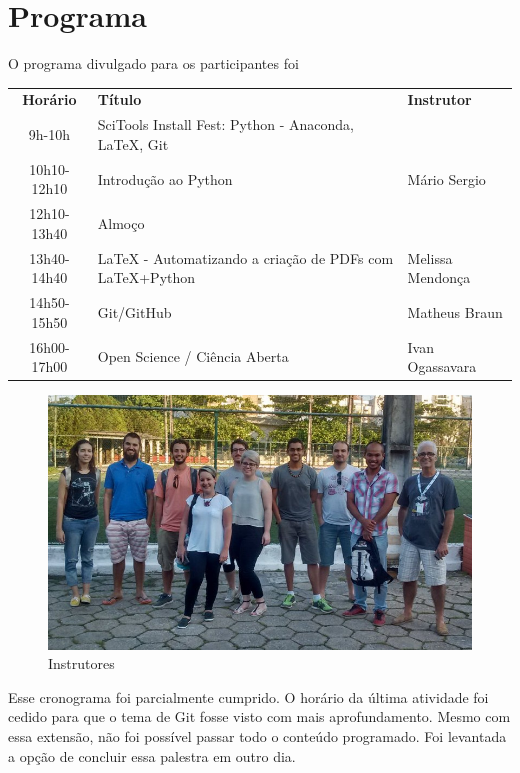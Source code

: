 \documentclass[12pt]{article}
\begin{document}
\newpage

\section*{Programa}

O programa divulgado para os participantes foi

\begin{tabular}{cp{}l}
  \textbf{Horário} & \textbf{Título} & \textbf{Instrutor} \\
  9h-10h & SciTools Install Fest: Python - Anaconda, LaTeX, Git & \\
  10h10-12h10 & Introdução ao Python & Mário Sergio \\
  12h10-13h40 & Almoço \\
  13h40-14h40 & LaTeX - Automatizando a criação de PDFs com LaTeX+Python & Melissa Mendonça \\
  14h50-15h50 & Git/GitHub & Matheus Braun \\
  16h00-17h00 & Open Science / Ciência Aberta & Ivan Ogassavara \\
\end{tabular}

\begin{figure}[!htb]
\includegraphics[width=\textwidth]{../../media/photos/pre4-cut}
\caption{Instrutores}
\end{figure}

Esse cronograma foi parcialmente cumprido. O horário da última atividade foi cedido para que o tema de Git fosse visto com mais aprofundamento. Mesmo com essa extensão, não foi possível passar todo o conteúdo programado. Foi levantada a opção de concluir essa palestra em outro dia.
\end{document}
